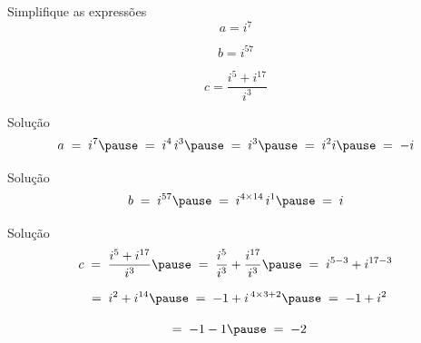 \begin{question}
  Simplifique as expressões
  \Large
  \[
    a = i^7
  \]

  \[
    b = i^{57}
  \]

  \[
    c = \frac{i^5 + i^{17}}{i^3}
  \]
\end{question}

\begin{resolution}{Solução}
  \Large
  \[
    a
    \;=\; i^7
    \pause
    \;=\; i^4 \, i^3
    \pause
    \;=\; i^3
    \pause
    \;=\; i^2 i
    \pause
    \;=\; -i
  \]
\end{resolution}

\begin{resolution}{Solução}
  \Large
  \[
    b
    \;=\; i^{57}
    \pause
    \;=\; i^{4\times 14} \, i^1
    \pause
    \;=\; i
  \]
\end{resolution}

\begin{resolution}{Solução}
  \Large
  \[
    c
    \;=\; \frac{i^5 + i^{17}}{i^3}
    \pause
    \;=\; \frac{i^5}{i^3} + \frac{i^{17}}{i^3}
    \pause
    \;=\; i^{5-3} + i^{17-3}
  \]

  \pause
  \[
    \vphantom{c}
    \;=\; i^2 + i^{14}
    \pause
    \;=\; -1 + i^{\,4\times 3+2}
    \pause
    \;=\; -1 + i^2
  \]

  \pause
  \[
    \vphantom{c}
    \;=\; -1 -1
    \pause
    \;=\; -2
  \]
\end{resolution}

